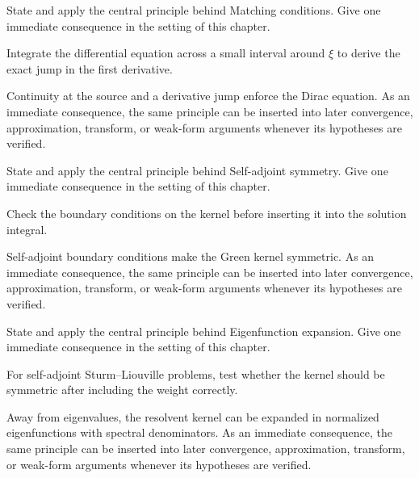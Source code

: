 \begin{exercise}\label{exr:iii26-05}
State and apply the central principle behind Matching conditions. Give one immediate consequence in the setting of this chapter.
\end{exercise}
\begin{hint}
Integrate the differential equation across a small interval around \(\xi\) to derive the exact jump in the first derivative.
\end{hint}
\begin{solution}
Continuity at the source and a derivative jump enforce the Dirac equation. As an immediate consequence, the same principle can be inserted into later convergence, approximation, transform, or weak-form arguments whenever its hypotheses are verified.
\end{solution}

\begin{exercise}\label{exr:iii26-06}
State and apply the central principle behind Self-adjoint symmetry. Give one immediate consequence in the setting of this chapter.
\end{exercise}
\begin{hint}
Check the boundary conditions on the kernel before inserting it into the solution integral.
\end{hint}
\begin{solution}
Self-adjoint boundary conditions make the Green kernel symmetric. As an immediate consequence, the same principle can be inserted into later convergence, approximation, transform, or weak-form arguments whenever its hypotheses are verified.
\end{solution}

\begin{exercise}\label{exr:iii26-07}
State and apply the central principle behind Eigenfunction expansion. Give one immediate consequence in the setting of this chapter.
\end{exercise}
\begin{hint}
For self-adjoint Sturm--Liouville problems, test whether the kernel should be symmetric after including the weight correctly.
\end{hint}
\begin{solution}
Away from eigenvalues, the resolvent kernel can be expanded in normalized eigenfunctions with spectral denominators. As an immediate consequence, the same principle can be inserted into later convergence, approximation, transform, or weak-form arguments whenever its hypotheses are verified.
\end{solution}

